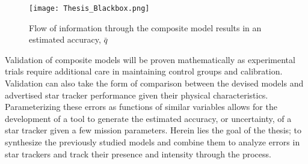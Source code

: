     \begin{figure}[h]
        \centering
        \texttt{[image: Thesis\_Blackbox.png]}
        \caption{Flow of information through the composite model results in an estimated accuracy, $\bar{q}$}
    \end{figure}

\par \qquad Validation of composite models will be proven mathematically as experimental trials require additional care in maintaining control groups and calibration. 
Validation can also take the form of comparison between the devised models and advertised star tracker performance given their physical characteristics.
Parameterizing these errors as functions of similar variables allows for the development of a tool to generate the estimated accuracy, or uncertainty, of a star tracker given a few mission parameters. 
Herein lies the goal of the thesis; to synthesize the previously studied models and combine them to analyze errors in star trackers and track their presence and intensity through the process.
